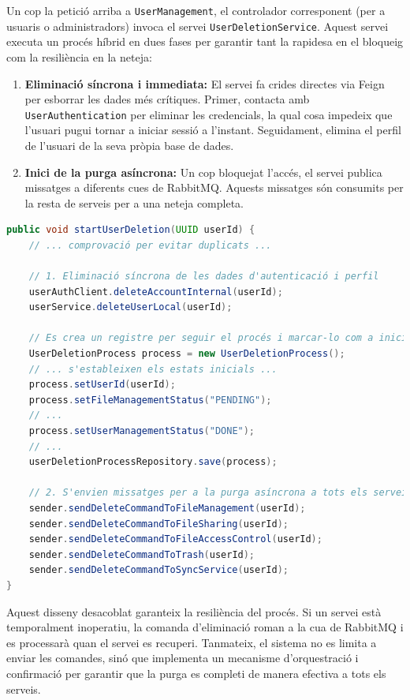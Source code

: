 Un cop la petició arriba a \texttt{UserManagement}, el controlador corresponent (per a usuaris o administradors) invoca el servei \texttt{UserDeletionService}. Aquest servei executa un procés híbrid en dues fases per garantir tant la rapidesa en el bloqueig com la resiliència en la neteja:

\begin{enumerate}
    \item \textbf{Eliminació síncrona i immediata:} El servei fa crides directes via Feign per esborrar les dades més crítiques. Primer, contacta amb \texttt{UserAuthentication} per eliminar les credencials, la qual cosa impedeix que l'usuari pugui tornar a iniciar sessió a l'instant. Seguidament, elimina el perfil de l'usuari de la seva pròpia base de dades.
    
    \item \textbf{Inici de la purga asíncrona:} Un cop bloquejat l'accés, el servei publica missatges a diferents cues de RabbitMQ. Aquests missatges són consumits per la resta de serveis per a una neteja completa.
\end{enumerate}

\begin{lstlisting}[language=Java, caption={Inici del procés d'eliminació a `UserDeletionService`}]
public void startUserDeletion(UUID userId) {
    // ... comprovació per evitar duplicats ...

    // 1. Eliminació síncrona de les dades d'autenticació i perfil
    userAuthClient.deleteAccountInternal(userId);
    userService.deleteUserLocal(userId);

    // Es crea un registre per seguir el procés i marcar-lo com a iniciat
    UserDeletionProcess process = new UserDeletionProcess();
    // ... s'estableixen els estats inicials ...
    process.setUserId(userId);
    process.setFileManagementStatus("PENDING");
    // ...
    process.setUserManagementStatus("DONE");
    // ...
    userDeletionProcessRepository.save(process);

    // 2. S'envien missatges per a la purga asíncrona a tots els serveis implicats
    sender.sendDeleteCommandToFileManagement(userId);
    sender.sendDeleteCommandToFileSharing(userId);
    sender.sendDeleteCommandToFileAccessControl(userId);
    sender.sendDeleteCommandToTrash(userId);
    sender.sendDeleteCommandToSyncService(userId);
}
\end{lstlisting}

Aquest disseny desacoblat garanteix la resiliència del procés. Si un servei està temporalment inoperatiu, la comanda d'eliminació roman a la cua de RabbitMQ i es processarà quan el servei es recuperi. Tanmateix, el sistema no es limita a enviar les comandes, sinó que implementa un mecanisme d'orquestració i confirmació per garantir que la purga es completi de manera efectiva a tots els serveis.

